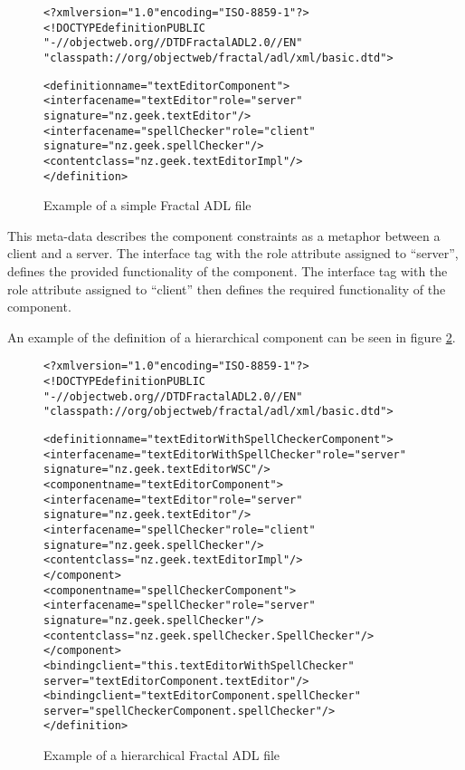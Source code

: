 \begin{figure}[htp]
\begin{center}
\begin{framed}
\begin{alltt}
<?xml version="1.0" encoding="ISO-8859-1" ?>
<!DOCTYPE definition PUBLIC 
    "-//objectweb.org//DTD Fractal ADL 2.0//EN" 
    "classpath://org/objectweb/fractal/adl/xml/basic.dtd">

<definition name="textEditorComponent">
  <interface name="textEditor" role = "server" 
   signature = "nz.geek.textEditor"/>
  <interface name="spellChecker" role = "client" 
   signature = "nz.geek.spellChecker"/>
  <content class="nz.geek.textEditorImpl"/>
</definition>
\end{alltt}
\end{framed}
  \caption{Example of a simple Fractal ADL file}
  \label{fractalmetadata}
\end{center}
\end{figure}

This meta-data describes the component constraints as a metaphor between a client and a server.
The interface tag with the role attribute assigned to ``server'', defines the provided functionality of the component.
The interface tag with the role attribute assigned to ``client'' then defines the required functionality of the component.  

An example of the definition of a hierarchical component can be seen in figure \ref{fractalrecursve}.

\begin{figure}[htp]
\begin{center}
\begin{framed}
\begin{alltt}
<?xml version="1.0" encoding="ISO-8859-1" ?>
<!DOCTYPE definition PUBLIC 
    "-//objectweb.org//DTD Fractal ADL 2.0//EN" 
    "classpath://org/objectweb/fractal/adl/xml/basic.dtd">

<definition name="textEditorWithSpellCheckerComponent">
  <interface name="textEditorWithSpellChecker" role="server" 
   signature="nz.geek.textEditorWSC"/>
  <component name="textEditorComponent">
    <interface name="textEditor" role="server" 
     signature="nz.geek.textEditor"/>
    <interface name="spellChecker" role="client" 
     signature="nz.geek.spellChecker"/>
    <content class="nz.geek.textEditorImpl"/>
  </component>
  <component name="spellCheckerComponent">
    <interface name="spellChecker" role="server" 
     signature="nz.geek.spellChecker"/>
    <content class="nz.geek.spellChecker.SpellChecker"/>
  </component>
  <binding client="this.textEditorWithSpellChecker" 
   server="textEditorComponent.textEditor"/>
  <binding client="textEditorComponent.spellChecker" 
   server="spellCheckerComponent.spellChecker"/>
</definition>
\end{alltt}
\end{framed}
  \caption{Example of a hierarchical Fractal ADL file}
  \label{fractalrecursve}
\end{center}
\end{figure}

